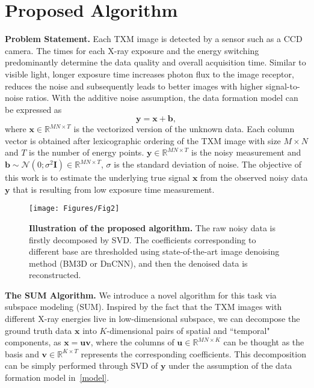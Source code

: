 \documentclass[10pt,twocolumn,letterpaper]{article}
\begin{document}
\section{Proposed Algorithm}
\label{method}

\textbf{Problem Statement.} Each TXM image is detected by a sensor such as a CCD camera. The times for each X-ray exposure and the energy switching predominantly determine the data quality and overall acquisition time. Similar to visible light, longer exposure time increases photon flux to the image receptor, reduces the noise and subsequently leads to better images with higher signal-to-noise ratios. With the additive noise assumption, the data formation model can be expressed as
\begin{equation}
\label{model}
    \mathrm{\mathbf{y}} = \mathrm{\mathbf{x}} + \mathrm{\mathbf{b}},
\end{equation}
where $\mathrm{\mathbf{x}} \in \mathbb{R}^{MN\times T}$ is the vectorized version of the unknown data. Each column vector is obtained after lexicographic ordering of the TXM image with size $M\times N$ and $T$ is the number of energy points. $\mathrm{\mathbf{y}} \in \mathbb{R}^{MN\times T}$ is the noisy measurement and $\mathrm{\mathbf{b}}\sim\mathcal{N}(0; \sigma^2\mathbf{I})\in \mathbb{R}^{MN\times T}$, $\sigma$ is the standard deviation of noise. The objective of this work is to estimate the underlying true signal $\mathrm{\mathbf{x}}$ from the observed noisy data $\mathrm{\mathbf{y}}$ that is resulting from low exposure time measurement. 

\begin{figure}
  \centering
    \texttt{[image: Figures/Fig2]}
    \vspace{-10pt}
    \caption{\textbf{Illustration of the proposed algorithm.} The raw noisy data is firstly decomposed by SVD. The coefficients corresponding to different base are thresholded using state-of-the-art image denoising method (\eg BM3D or DnCNN), and then the denoised data is reconstructed.}
    \vspace{-14pt}
    \label{fig2}
\end{figure}
\textbf{The SUM Algorithm.} We introduce a novel algorithm for this task via subspace modeling (SUM). Inspired by the fact that the TXM images with different X-ray energies live in low-dimensional subspace, we can decompose the ground truth data $\mathrm{\mathbf{x}}$ into $K$-dimensional pairs of spatial and ``temporal" components, as $\mathrm{\mathbf{x}}=\mathrm{\mathbf{u}}\mathrm{\mathbf{v}}$, where the columns of $\mathrm{\mathbf{u}} \in \mathbb{R}^{MN\times K}$ can be thought as the basis and $\mathrm{\mathbf{v}}\in \mathbb{R}^{K\times T}$ represents the corresponding coefficients. This decomposition can be simply performed through SVD of $\mathrm{\mathbf{y}}$ under the assumption of the data formation model in~\cref{model}.  
\end{document}
